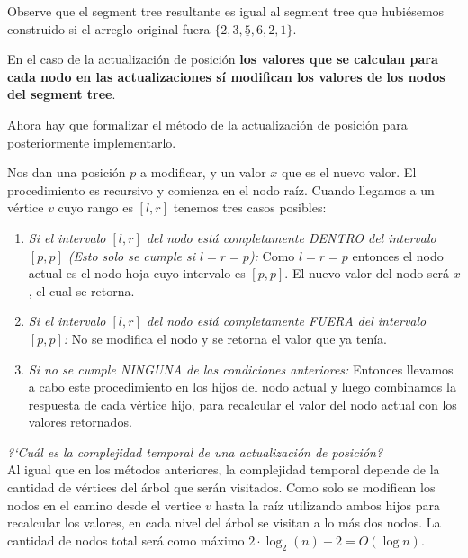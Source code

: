 Observe que el segment tree resultante es igual al segment tree que hubi\'esemos construido si el arreglo original fuera $\{2, 3, \underline{5}, 6, 2, 1\}$.

En el caso de la actualizaci\'on de posici\'on \textbf{los valores que se calculan para cada nodo en las actualizaciones s\'i modifican los valores de los nodos del segment tree}.

Ahora hay que formalizar el m\'etodo de la actualizaci\'on de posici\'on para posteriormente implementarlo. 

\begin{corollary}
    Nos dan una posici\'on $p$ a modificar, y un valor $x$ que es el nuevo valor. El procedimiento es recursivo y comienza en el nodo ra\'iz. Cuando llegamos a un v\'ertice $v$ cuyo rango es $[l, r]$ tenemos tres casos posibles:

    \begin{enumerate}
        \item{
            \textit{Si el intervalo $[l, r]$ del nodo est\'a completamente DENTRO del intervalo $[p, p]$ (Esto solo se cumple si $l = r = p$):}  Como $l = r = p$ entonces el nodo actual es el nodo hoja cuyo intervalo es $[p, p]$. El nuevo valor del nodo ser\'a $x$, el cual se retorna.
        }
        \item{
            \textit{Si el intervalo $[l, r]$ del nodo est\'a completamente FUERA del intervalo $[p, p]$:} No se modifica el nodo y se retorna el valor que ya ten\'ia.
        }
        \item{
            \textit{Si no se cumple NINGUNA de las condiciones anteriores:} Entonces llevamos a cabo este procedimiento en los hijos del nodo actual y luego combinamos la respuesta de cada v\'ertice hijo, para recalcular el valor del nodo actual con los valores retornados.
        }
    \end{enumerate}
\end{corollary}

\noindent\textit{?`Cuál es la complejidad temporal de una actualizaci\'on de posici\'on?} \\
Al igual que en los m\'etodos anteriores, la complejidad temporal depende de la cantidad de v\'ertices del \'arbol que ser\'an visitados. Como solo se modifican los nodos en el camino desde el vertice $v$ hasta la ra\'iz utilizando ambos hijos para recalcular los valores, en cada nivel del \'arbol se visitan a lo m\'as dos nodos. La cantidad de nodos total ser\'a como m\'aximo $2 \cdot \log_2(n) + 2 = O(\log n)$.


